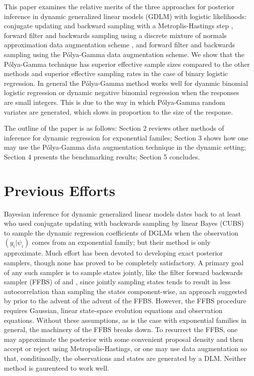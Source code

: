 \documentclass[11pt]{article}
\newcommand{\Polya}{P\'{o}lya}
\begin{document}
This paper examines the relative merits of the three approaches for posterior
inference in dynamic generalized linear models (GDLM) with logistic likelihoods:
conjugate updating and backward sampling with a Metroplis-Hastings step
\citep{ravines-etal-2006}, forward filter and backwards sampling using a
discrete mixture of normals approximation data augmentation scheme
\citep{fruhwirth-schnatter-etal-2009, fussl-etal-2013}, and forward filter and
backwards sampling using the \Polya-Gamma data augmentation scheme.  We show
that the \Polya-Gamma technique has superior effective sample sizes compared to
the other methods and superior effective sampling rates in the case of binary
logistic regression.  In general the \Polya-Gamma method works well for dyanmic
binomial logistic regression or dynamic negative binomial regression when the
responses are small integers.  This is due to the way in which \Polya-Gamma
random variates are generated, which slows in proportion to the size of the
response.

The outline of the paper is as follows: Section 2 reviews other methods of
inference for dynamic regression for exponential familes; Section 3 shows how
one may use the \Polya-Gamma data augmentation technique in the dynamic setting;
Section 4 presents the benchmarking results; Section 5 concludes.

\section{Previous Efforts}

Bayesian inference for dynamic generalized linear models dates back to at least
\cite{west-etal-1985} who used conjugate updating with backwards sampling by
linear Bayes (CUBS) to sample the dynamic regression coefficients of DGLMs when
the observation $(y_i | \psi_i)$ comes from an exponential family; but their
method is only approximate.  Much effort has been devoted to developing exact
posterior samplers, though none has proved to be completely satisfactory.  A
primary goal of any such sampler is to sample states jointly, like the filter
forward backwards sampler (FFBS) of \cite{fruhwirth-schnatter-1994} and
\cite{carter-kohn-1994}, since jointly sampling states tends to result in less
autocorrelation than sampling the states component-wise, an approach suggested
by \cite{carlin-etal-1992} prior to the advent of the advent of the FFBS.
However, the FFBS procedure requires Gaussian, linear state-space evolution
equations and observation equations.  Without these assumptions, as is the case
with exponential families in general, the machinery of the FFBS breaks down.  To
resurrect the FFBS, one may approximate the posterior with some convenient
proposal density and then accept or reject using Metropolis-Hastings, or one may
use data augmentation so that, conditinoally, the observations and states are
generated by a DLM.  Neither method is gaurenteed to work well.
\end{document}
